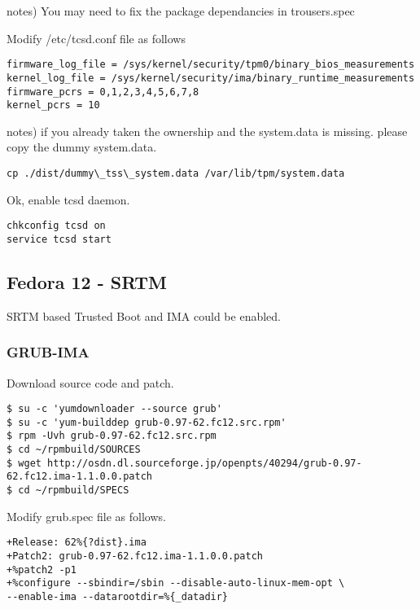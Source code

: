 notes) You may need to fix the package dependancies in trousers.spec


Modify /etc/tcsd.conf file as follows

\begin{lstlisting}[style=source_code]
firmware_log_file = /sys/kernel/security/tpm0/binary_bios_measurements
kernel_log_file = /sys/kernel/security/ima/binary_runtime_measurements
firmware_pcrs = 0,1,2,3,4,5,6,7,8
kernel_pcrs = 10
\end{lstlisting}

notes) if you already taken the ownership and the system.data is missing. please copy the dummy system.data.

\begin{lstlisting}[style=source_code]
cp ./dist/dummy\_tss\_system.data /var/lib/tpm/system.data
\end{lstlisting}

Ok, enable tcsd daemon.

\begin{lstlisting}[style=source_code]
chkconfig tcsd on
service tcsd start
\end{lstlisting}


\subsection{Fedora 12 - SRTM} 

SRTM based Trusted Boot and IMA could be enabled.

\subsubsection{GRUB-IMA} 

Download source code and patch.

\begin{lstlisting}[style=console, linewidth = 170mm]
$ su -c 'yumdownloader --source grub'
$ su -c 'yum-builddep grub-0.97-62.fc12.src.rpm'
$ rpm -Uvh grub-0.97-62.fc12.src.rpm
$ cd ~/rpmbuild/SOURCES
$ wget http://osdn.dl.sourceforge.jp/openpts/40294/grub-0.97-62.fc12.ima-1.1.0.0.patch
$ cd ~/rpmbuild/SPECS
\end{lstlisting}

Modify grub.spec file as follows.

\begin{lstlisting}[style=source_code]
+Release: 62%{?dist}.ima
+Patch2: grub-0.97-62.fc12.ima-1.1.0.0.patch
+%patch2 -p1
+%configure --sbindir=/sbin --disable-auto-linux-mem-opt \
--enable-ima --datarootdir=%{_datadir}
\end{lstlisting}

